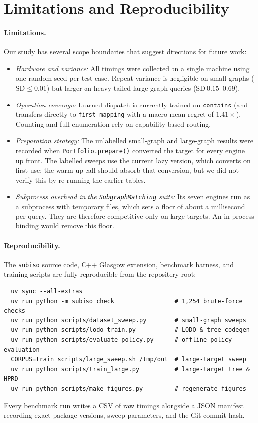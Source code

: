 \documentclass[11pt,a4paper]{article}
\begin{document}
\section{Limitations and Reproducibility}

\paragraph{Limitations.} Our study has several scope boundaries that suggest directions for future work:
\begin{itemize}
    \item \emph{Hardware and variance:} All timings were collected on a single machine using one random seed per test case. Repeat variance is negligible on small graphs ($\text{SD} \le 0.01$) but larger on heavy-tailed large-graph queries ($\text{SD}\ 0.15\text{--}0.69$).
    \item \emph{Operation coverage:} Learned dispatch is currently trained on \texttt{contains} (and transfers directly to \texttt{first\_mapping} with a macro mean regret of $1.41\times$). Counting and full enumeration rely on capability-based routing.
    \item \emph{Preparation strategy:} The unlabelled small-graph and large-graph results were recorded when \texttt{Portfolio.prepare()} converted the target for every engine up front. The labelled sweeps use the current lazy version, which converts on first use; the warm-up call should absorb that conversion, but we did not verify this by re-running the earlier tables.
    \item \emph{Subprocess overhead in the \texttt{SubgraphMatching} suite:} Its seven engines run as a subprocess with temporary files, which sets a floor of about a millisecond per query. They are therefore competitive only on large targets. An in-process binding would remove this floor.
\end{itemize}

\paragraph{Reproducibility.} The \texttt{subiso} source code, C++ Glasgow extension, benchmark harness, and training scripts are fully reproducible from the repository root:
{\small
\begin{verbatim}
  uv sync --all-extras
  uv run python -m subiso check                 # 1,254 brute-force checks
  uv run python scripts/dataset_sweep.py        # small-graph sweeps
  uv run python scripts/lodo_train.py           # LODO & tree codegen
  uv run python scripts/evaluate_policy.py      # offline policy evaluation
  CORPUS=train scripts/large_sweep.sh /tmp/out  # large-target sweep
  uv run python scripts/train_large.py          # large-target tree & HPRD
  uv run python scripts/make_figures.py         # regenerate figures
\end{verbatim}
}
\noindent
Every benchmark run writes a CSV of raw timings alongside a JSON manifest recording exact package versions, sweep parameters, and the Git commit hash.



\end{document}
